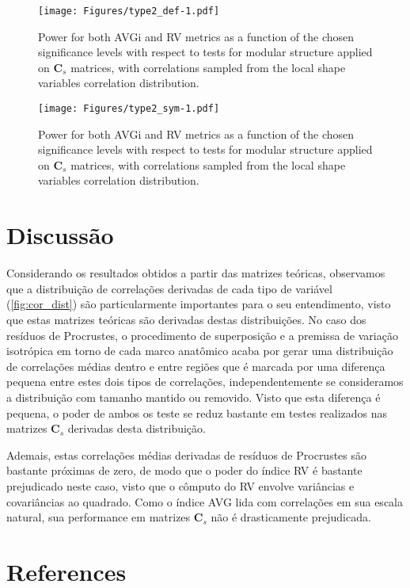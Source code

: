 \documentclass[12pt,]{article}
\begin{document}
\begin{figure}[htbp]
\centering
\texttt{[image: Figures/type2\_def-1.pdf]}
\caption{Power for both AVGi and RV metrics as a function of the chosen
significance levels with respect to tests for modular structure applied
on $\mathbf{C}_s$ matrices, with correlations sampled from the local
shape variables correlation distribution. \label{fig:type2_def}}
\end{figure}

\begin{figure}[htbp]
\centering
\texttt{[image: Figures/type2\_sym-1.pdf]}
\caption{Power for both AVGi and RV metrics as a function of the chosen
significance levels with respect to tests for modular structure applied
on $\mathbf{C}_s$ matrices, with correlations sampled from the local
shape variables correlation distribution. \label{fig:type2_sym}}
\end{figure}

\section{Discussão}\label{discussao}

Considerando os resultados obtidos a partir das matrizes teóricas,
observamos que a distribuição de correlações derivadas de cada tipo de
variável (\autoref{fig:cor_dist}) são particularmente importantes para o
seu entendimento, visto que estas matrizes teóricas são derivadas destas
distribuições. No caso dos resíduos de Procrustes, o procedimento de
superposição e a premissa de variação isotrópica em torno de cada marco
anatômico acaba por gerar uma distribuição de correlações médias dentro
e entre regiões que é marcada por uma diferença pequena entre estes dois
tipos de correlações, independentemente se consideramos a distribuição
com tamanho mantido ou removido. Visto que esta diferença é pequena, o
poder de ambos os teste se reduz bastante em testes realizados nas
matrizes $\mathbf{C}_s$ derivadas desta distribuição.

Ademais, estas correlações médias derivadas de resíduos de Procrustes
são bastante próximas de zero, de modo que o poder do índice RV é
bastante prejudicado neste caso, visto que o cômputo do RV envolve
variâncias e covariâncias ao quadrado. Como o índice AVG lida com
correlações em sua escala natural, sua performance em matrizes
$\mathbf{C}_s$ não é drasticamente prejudicada.

\section*{References}\label{references}
\end{document}
